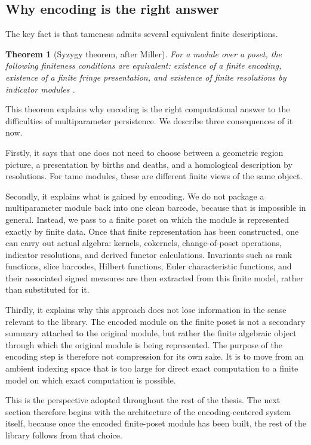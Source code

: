 \documentclass[11pt]{article}
\newtheorem{theorem}{Theorem}
\theoremstyle{definition}
\theoremstyle{remark}
\begin{document}
\subsection{Why encoding is the right answer}

The key fact is that tameness admits several equivalent finite descriptions.

\begin{theorem}[Syzygy theorem, after Miller]
For a module over a poset, the following finiteness conditions are equivalent: existence of a finite encoding, existence of a finite fringe presentation, and existence of finite resolutions by indicator modules \cite{Mil20}.
\end{theorem}

This theorem explains why encoding is the right computational answer to the difficulties of multiparameter persistence. We describe three consequences of it now.

Firstly, it says that one does not need to choose between a geometric region picture, a presentation by births and deaths, and a homological description by resolutions. For tame modules, these are different finite views of the same object.

Secondly, it explains what is gained by encoding. We do not package a multiparameter module back into one clean barcode, because that is impossible in general. Instead, we pass to a finite poset on which the module is represented exactly by finite data. Once that finite representation has been constructed, one can carry out actual algebra: kernels, cokernels, change-of-poset operations, indicator resolutions, and derived functor calculations. Invariants such as rank functions, slice barcodes, Hilbert functions, Euler characteristic functions, and their associated signed measures are then extracted from this finite model, rather than substituted for it.

Thirdly, it explains why this approach does not lose information in the sense relevant to the library. The encoded module on the finite poset is not a secondary summary attached to the original module, but rather the finite algebraic object through which the original module is being represented. The purpose of the encoding step is therefore not compression for its own sake. It is to move from an ambient indexing space that is too large for direct exact computation to a finite model on which exact computation is possible.

This is the perspective adopted throughout the rest of the thesis. The next section therefore begins with the architecture of the encoding-centered system itself, because once the encoded finite-poset module has been built, the rest of the library follows from that choice.
\end{document}
